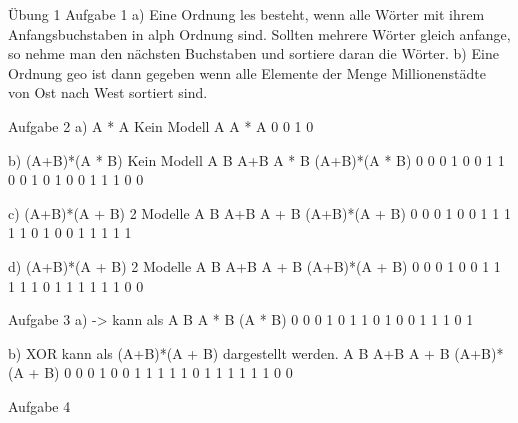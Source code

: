 Übung 1 
Aufgabe 1
a) Eine Ordnung les besteht, wenn alle Wörter  mit ihrem Anfangsbuchstaben in alph Ordnung sind.
   Sollten mehrere Wörter gleich anfange, so nehme man den nächsten Buchstaben und sortiere daran 
   die Wörter.
b) Eine Ordnung geo ist dann gegeben wenn alle Elemente der Menge Millionenstädte von Ost nach 
   West sortiert sind.
 
  
Aufgabe 2
a) A * \lnot A
Kein Modell
A	A * \lnot A
0	0
1	0

b) (A+B)*(\lnot A * \lnot B)
Kein Modell
A	B	A+B	\lnot A * \lnot B	(A+B)*(\lnot A * \lnot B)
0	0	0	1	0
0	1	1	0	0
1	0	1	0	0
1	1	1	0	0

c) (A+B)*(\lnot A + B)
2 Modelle
A	B	A+B	\lnot A + B	(A+B)*(\lnot A + B)
0	0	0	1	0
0	1	1	1	1
1	0	1	0	0
1	1	1	1	1

d) (A+B)*(\lnot A + \lnot B)
2 Modelle
A	B	A+B	\lnot A + \lnot B	(A+B)*(\lnot A + \lnot B)
0	0	0	1	0
0	1	1	1	1
1	0	1	1	1
1	1	1	0	0


Aufgabe 3
a) -> kann als
A	B	\lnot A * B	\lnot (\lnot A * B)
0	0	0	1
0	1	1	0
1	0	0	1
1	1	0	1

b) XOR kann als (A+B)*(\lnot A + \lnot B) dargestellt werden.
A	B	A+B	\lnot A + \lnot B	(A+B)*(\lnot A + \lnot B)
0	0	0	1	0
0	1	1	1	1
1	0	1	1	1
1	1	1	0	0

Aufgabe 4
